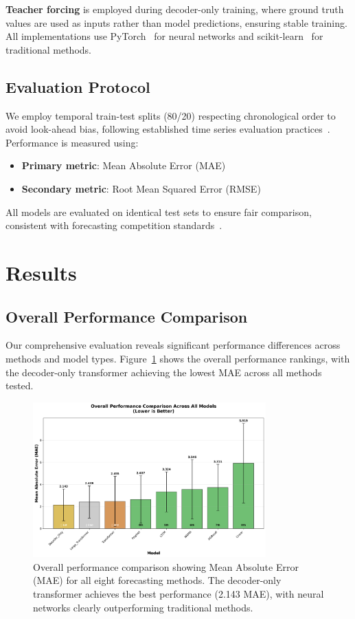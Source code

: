 \documentclass[11pt]{article}
\begin{document}
\textbf{Teacher forcing} is employed during decoder-only training, where ground truth values are used as inputs rather than model predictions, ensuring stable training. All implementations use PyTorch~\cite{paszke2019pytorch} for neural networks and scikit-learn~\cite{pedregosa2011scikit} for traditional methods.

\subsection{Evaluation Protocol}

We employ temporal train-test splits (80/20) respecting chronological order to avoid look-ahead bias, following established time series evaluation practices~\cite{hyndman2018forecasting}. Performance is measured using:
\begin{itemize}
\item \textbf{Primary metric}: Mean Absolute Error (MAE)
\item \textbf{Secondary metric}: Root Mean Squared Error (RMSE)
\end{itemize}

All models are evaluated on identical test sets to ensure fair comparison, consistent with forecasting competition standards~\cite{makridakis2020m4}.

\section{Results}

\subsection{Overall Performance Comparison}

Our comprehensive evaluation reveals significant performance differences across methods and model types. Figure~\ref{fig:overall_performance} shows the overall performance rankings, with the decoder-only transformer achieving the lowest MAE across all methods tested.

\begin{figure}[h]
\centering
\includegraphics[width=0.8\textwidth]{../results/figure1_overall_performance.png}
\caption{Overall performance comparison showing Mean Absolute Error (MAE) for all eight forecasting methods. The decoder-only transformer achieves the best performance (2.143 MAE), with neural networks clearly outperforming traditional methods.}
\label{fig:overall_performance}
\end{figure}
\end{document}
